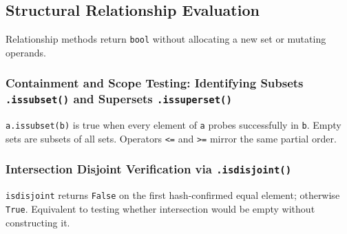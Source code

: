 \subsection{Structural Relationship Evaluation}

Relationship methods return \texttt{bool} without allocating a new set or mutating operands.

\subsubsection{Containment and Scope Testing: Identifying Subsets \texttt{.issubset()} and Supersets \texttt{.issuperset()}}

\texttt{a.issubset(b)} is true when every element of \texttt{a} probes successfully in \texttt{b}. Empty sets are subsets of all sets. Operators \texttt{<=} and \texttt{>=} mirror the same partial order.

\subsubsection{Intersection Disjoint Verification via \texttt{.isdisjoint()}}

\texttt{isdisjoint} returns \texttt{False} on the first hash-confirmed equal element; otherwise \texttt{True}. Equivalent to testing whether intersection would be empty without constructing it.
